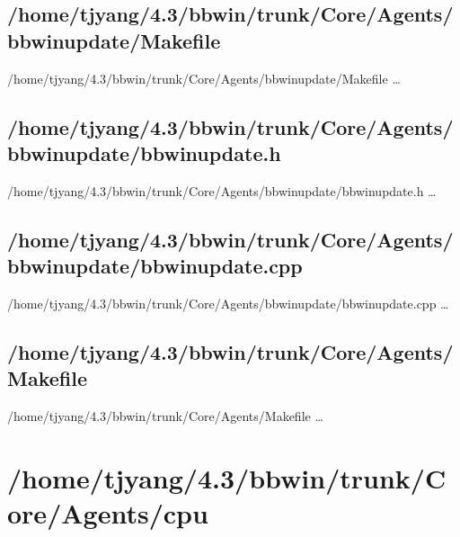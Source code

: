 \subsection{/home/tjyang/4.3/bbwin/trunk/Core/Agents/bbwinupdate/Makefile}
\lstset{numberstyle=\tiny,numbers=left,
   breaklines=true,
   stepnumber=1,numbersep=5pt,firstnumber=1,
   xleftmargin=12pt,showstringspaces=false}
\noindent /home/tjyang/4.3/bbwin/trunk/Core/Agents/bbwinupdate/Makefile  \ldots



\subsection{/home/tjyang/4.3/bbwin/trunk/Core/Agents/bbwinupdate/bbwinupdate.h}
\lstset{numberstyle=\tiny,numbers=left,
   breaklines=true,
   stepnumber=1,numbersep=5pt,firstnumber=1,
   xleftmargin=12pt,showstringspaces=false}
\noindent /home/tjyang/4.3/bbwin/trunk/Core/Agents/bbwinupdate/bbwinupdate.h  \ldots




\subsection{/home/tjyang/4.3/bbwin/trunk/Core/Agents/bbwinupdate/bbwinupdate.cpp}
\lstset{numberstyle=\tiny,numbers=left,
   breaklines=true,
   stepnumber=1,numbersep=5pt,firstnumber=1,
   xleftmargin=12pt,showstringspaces=false}
\noindent /home/tjyang/4.3/bbwin/trunk/Core/Agents/bbwinupdate/bbwinupdate.cpp  \ldots



\subsection{/home/tjyang/4.3/bbwin/trunk/Core/Agents/Makefile}
\lstset{numberstyle=\tiny,numbers=left,
   breaklines=true,
   stepnumber=1,numbersep=5pt,firstnumber=1,
   xleftmargin=12pt,showstringspaces=false}
\noindent /home/tjyang/4.3/bbwin/trunk/Core/Agents/Makefile  \ldots



\section{/home/tjyang/4.3/bbwin/trunk/Core/Agents/cpu}

